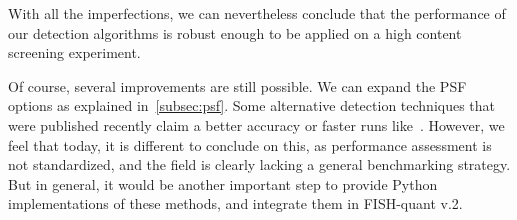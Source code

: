 With all the imperfections, we can nevertheless conclude that the performance of our detection algorithms is robust enough to be applied on a high content screening experiment.


Of course, several improvements are still possible.
We can expand the \ac{PSF} options as explained in~\ref{subsec:psf}.
Some alternative detection techniques that were published recently claim a better accuracy or faster runs like~\cite{bahry_rs-fish_2021, bouilhol_deepspot_2022}. However, we feel that today, it is different to conclude on this, as performance assessment is not standardized, and the field is clearly lacking a general benchmarking strategy. But in general, it would be another important step to provide Python implementations of these methods, and integrate them in FISH-quant v.2. 


